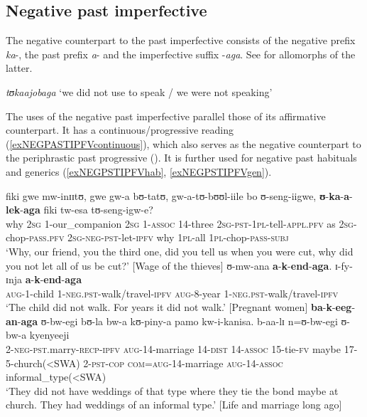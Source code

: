 \subsection{Negative past imperfective}\label{NegPSTIPFV}
The negative counterpart to the past imperfective consists of the negative prefix \textit{ka}-, the past prefix \textit{a}- and the imperfective  suffix -\textit{aga}. See  for allomorphs of the latter.

\begin{exe}
\ex \textit{tʊkaajobaga} \lq we did not use to speak / we were not speaking'
\end{exe}

The uses of the negative past imperfective parallel those of its affirmative counterpart. It has a continuous/progressive reading (\ref{exNEGPASTIPFVcontinuous}), which also serves as the negative counterpart to the periphrastic past progressive (). It is further used for negative past habituals and generics (\ref{exNEGPSTIPFVhab}, \ref{exNEGPSTIPFVgen}).

\begin{exe}
\ex \label{exNEGPASTIPFVcontinuous}\gll fiki gwe mw-inɪɪtʊ, gwe gw-a bʊ-tatʊ, gw-a-tʊ-bʊʊl-iile bo ʊ-seng-iigwe, \textbf{ʊ}-\textbf{ka}-\textbf{a}-\textbf{lek}-\textbf{aga} fiki tw-esa tʊ-seng-igw-e?\\
why \textsc{2sg} 1-our\_companion \textsc{2sg} 1-\textsc{assoc} 14-three \textsc{2sg}-\textsc{pst}-\textsc{1pl}-tell-\textsc{appl.pfv} as \textsc{2sg}-chop-\textsc{pass.pfv} \textsc{2sg}-\textsc{neg}-\textsc{pst}-let-\textsc{ipfv} why \textsc{1pl}-all \textsc{1pl}-chop-\textsc{pass}-\textsc{subj}\\
\glt `Why, our friend, you the third one, did you tell us when you were cut, why did you not let all of us be cut?' [Wage of the thieves]
\ex \label{exNEGPSTIPFVhab} \gll ʊ-mw-ana \textbf{a}-\textbf{k}-\textbf{end}-\textbf{aga}. ɪ-fy-ɪnja \textbf{a}-\textbf{k}-\textbf{end}-\textbf{aga}\\
\textsc{aug}-1-child 1-\textsc{neg}.\textsc{pst}-walk/travel-\textsc{ipfv} \textsc{aug}-8-year 1-\textsc{neg}.\textsc{pst}-walk/travel-\textsc{ipfv}\\
\glt `The child did not walk. For years it did not walk.' [Pregnant women]
\ex \label{exNEGPSTIPFVgen} \gll \textbf{ba}-\textbf{k}-\textbf{eeg}-\textbf{an}-\textbf{aga} ʊ-bw-egi bʊ-la bw-a kʊ-piny-a pamo kw-i-kanisa. b-aa-lɪ n=ʊ-bw-egi ʊ-bw-a kyenyeeji\\
2-\textsc{neg}-\textsc{pst}.marry-\textsc{recp}-\textsc{ipfv} \textsc{aug}-14-marriage 14-\textsc{dist} 14-\textsc{assoc} 15-tie-\textsc{fv} maybe 17-5-church(<SWA) 2-\textsc{pst}-\textsc{cop} \textsc{com}=\textsc{aug}-14-marriage \textsc{aug}-14-\textsc{assoc} informal\_type(<SWA)\\
\glt \lq They did not have weddings of that type where they tie the bond maybe at church. They had weddings of an informal type.' [Life and marriage long ago]  
\end{exe}

